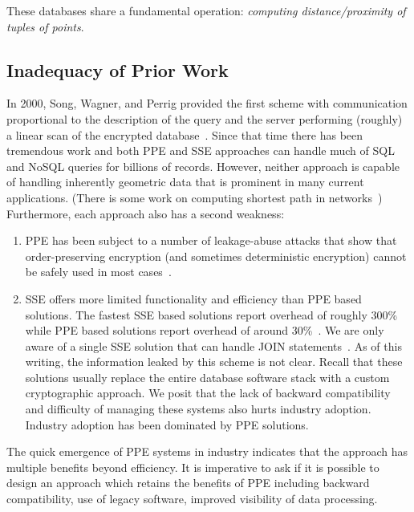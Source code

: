 \noindent
These databases share a fundamental operation: {\em
computing distance/proximity of tuples of points}. 

\subsection{Inadequacy of Prior Work}

In 2000, Song, Wagner, and Perrig provided the first scheme with communication proportional to the description of the query and the server performing (roughly) a linear scan of the encrypted database~\cite{SP:SonWagPer00}.  Since that time there has been tremendous work and both PPE and SSE approaches can handle much of SQL and NoSQL queries for billions of records.  However, neither approach is capable of handling inherently geometric data that is prominent in many current applications. (There is some work on computing shortest path in networks~\cite{CCS:MKNK15})  Furthermore, each approach also has a second weakness:
\begin{enumerate}
\item PPE has been subject to a number of leakage-abuse attacks that show that order-preserving encryption (and sometimes deterministic encryption) cannot be safely used in most cases~\cite{CCS:NavKamWri15,CCS:CGPR15,CCS:KKNO16,CCS:PouWri16,CCS:GMNRS16,EPRINT:GSBNR16,EPRINT:ZhaKatPap16}.
\item SSE offers more limited functionality and efficiency than PPE based solutions.  The fastest SSE based solutions report overhead of roughly 300\%~\cite{C:CJJKRS13,CCS:JJKRS13,NDSS:CJJJKR14,ESORICS:FJKNRS15} while PPE based solutions report overhead of around 30\%~\cite{CACM:PRZB12}.  We are only aware of a single SSE solution that can handle JOIN statements~\cite{EPRINT:KamMoa16}.  As of this writing, the information  leaked by this scheme is not clear.  Recall that these solutions usually replace the entire database software stack with a custom cryptographic approach.  We posit that the lack of backward compatibility and difficulty of managing these systems also hurts industry adoption.  Industry adoption has been dominated by PPE solutions.
\end{enumerate}

The quick emergence of PPE systems in industry indicates that the approach has multiple benefits beyond efficiency.  It is imperative to ask if it is possible to design an approach which retains the benefits of PPE including backward compatibility, use of legacy software, improved visibility of data processing.  

